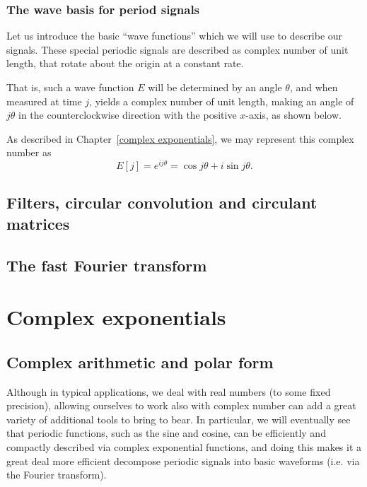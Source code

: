 \documentclass[12pt]{report}
\theoremstyle{plain}
\begin{document}
\subsection{The wave basis for period signals}

Let us introduce the basic ``wave functions'' which we will use to describe our signals. These special periodic signals are described as complex number of unit length, that rotate about the origin at a constant rate.

That is, such a wave function $E$ will be determined by an angle $\theta$, and when measured at time $j$, yields a complex number of unit length, making an angle of $j\theta$ in the counterclockwise direction with the positive $x$-axis, as shown below.

As described in Chapter~\ref{complex exponentials}, we may represent this complex number as 
\[E[j] = e^{ij\theta} = \cos{j\theta} + i \sin{j \theta}.\]



\section{Filters, circular convolution and circulant matrices}

\section{The fast Fourier transform}

\appendix

\chapter{Complex exponentials}

\section{Complex arithmetic and polar form}

Although in typical applications, we deal with real numbers (to some fixed precision), allowing ourselves to work also with complex number can add a great variety of additional tools to bring to bear. In particular, we will eventually see that periodic functions, such as the sine and cosine, can be efficiently and compactly described via complex exponential functions, and doing this makes it a great deal more efficient decompose periodic signals into basic waveforms (i.e. via the Fourier transform).
\end{document}
